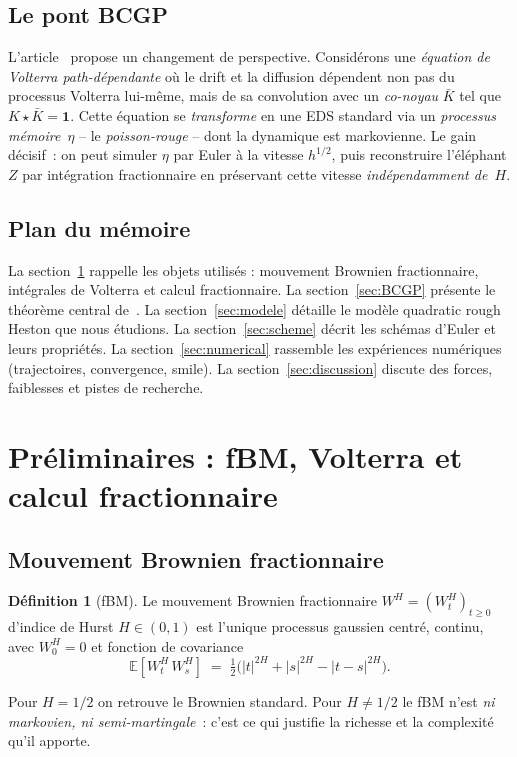 \documentclass[11pt,a4paper]{article}
\theoremstyle{definition}
\newtheorem{definition}[theorem]{Définition}
\newcommand{\E}{\mathbb{E}}
\newcommand{\1}{\mathbf{1}}
\begin{document}
\subsection{Le pont BCGP}
L'article~\cite{BCGP23} propose un changement de perspective. Considérons une
\emph{équation de Volterra path-dépendante} où le drift et la diffusion
dépendent non pas du processus Volterra lui-même, mais de sa convolution avec
un \emph{co-noyau} $\bar K$ tel que $K\star\bar K=\1$. Cette équation se
\emph{transforme} en une EDS standard via un \emph{processus mémoire}~$\eta$ --
le \emph{poisson-rouge} -- dont la dynamique est markovienne. Le gain décisif~:
on peut simuler $\eta$ par Euler à la vitesse $h^{1/2}$, puis reconstruire
l'éléphant $Z$ par intégration fractionnaire en préservant cette vitesse
\textit{indépendamment de~$H$}.

\subsection{Plan du mémoire}
La section~\ref{sec:prelim} rappelle les objets utilisés : mouvement Brownien
fractionnaire, intégrales de Volterra et calcul fractionnaire. La
section~\ref{sec:BCGP} présente le théorème central de~\cite{BCGP23}. La
section~\ref{sec:modele} détaille le modèle quadratic rough Heston que nous
étudions. La section~\ref{sec:scheme} décrit les schémas d'Euler et leurs
propriétés. La section~\ref{sec:numerical} rassemble les expériences numériques
(trajectoires, convergence, smile). La section~\ref{sec:discussion} discute des
forces, faiblesses et pistes de recherche.

\section{Préliminaires : fBM, Volterra et calcul fractionnaire}
\label{sec:prelim}

\subsection{Mouvement Brownien fractionnaire}
\begin{definition}[fBM]
Le mouvement Brownien fractionnaire $W^H = (W^H_t)_{t\geq 0}$ d'indice de Hurst
$H\in(0,1)$ est l'unique processus gaussien centré, continu, avec $W^H_0=0$ et
fonction de covariance
\[
\E[W^H_t\, W^H_s] \;=\; \tfrac{1}{2}\bigl(|t|^{2H}+|s|^{2H}-|t-s|^{2H}\bigr).
\]
\end{definition}

Pour $H=1/2$ on retrouve le Brownien standard. Pour $H\neq 1/2$ le fBM n'est
\emph{ni markovien, ni semi-martingale}~: c'est ce qui justifie la richesse et
la complexité qu'il apporte.
\end{document}
